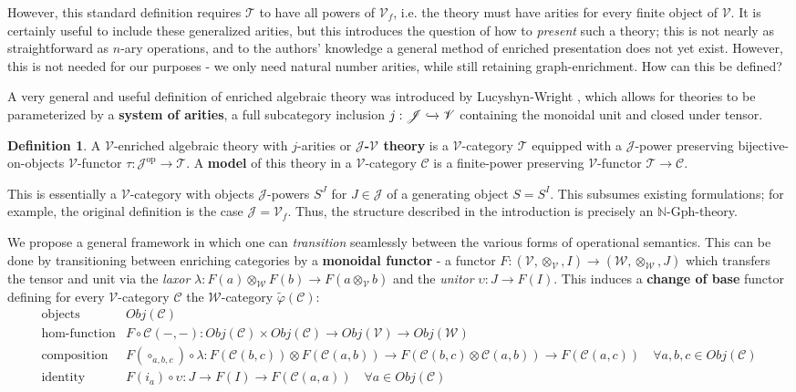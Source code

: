 \documentclass[a4paper,UKenglish]{article}
\theoremstyle{definition}
\newtheorem{definition}{Definition}[section]
\newcommand{\Gph}{\mathrm{Gph}}
\newcommand{\op}{\mathrm{op}}
\newcommand{\NN}{\mathbb{N}}
\newcommand{\V}{\mathscr{V}}
\newcommand{\W}{\mathscr{W}}
\newcommand{\C}{\mathscr{C}}
\newcommand{\T}{\mathscr{T}}
\newcommand{\J}{\mathscr{J}}
\begin{document}
However, this standard definition requires $\T$ to have all powers of $\V_f$, i.e. the theory must have arities for every finite object of $\V$. It is certainly useful to include these generalized arities, but this introduces the question of how to \textit{present} such a theory; this is not nearly as straightforward as $n$-ary operations, and to the authors' knowledge a general method of enriched presentation does not yet exist. However, this is not needed for our purposes - we only need natural number arities, while still retaining graph-enrichment. How can this be defined?

A very general and useful definition of enriched algebraic theory was introduced by Lucyshyn-Wright \cite{rbb}, which allows for theories to be parameterized by a \textbf{system of arities}, a full subcategory inclusion $j: \J \xhookrightarrow{} \V$ containing the monoidal unit and closed under tensor.

\theoremstyle{definition}
\begin{definition} A $\V$-enriched algebraic theory with $j$-arities or \textbf{$\J$-$\V$ theory} is a $\V$-category $\T$ equipped with a $\J$-power preserving bijective-on-objects $\V$-functor $\tau:\J^\op \to \T$. A \textbf{model} of this theory in a $\V$-category $\C$ is a finite-power preserving $\V$-functor $\T \to \C$.
\end{definition}

This is essentially a $\V$-category with objects $\J$-powers $S^J$ for $J \in \J$ of a generating object $S = S^I$. This subsumes existing formulations; for example, the original definition is the case $\J = \V_f$. Thus, the structure described in the introduction is precisely an $\NN$-$\Gph$-theory.



We propose a general framework in which one can \textit{transition} seamlessly between the various forms of operational semantics. This can be done by transitioning between enriching categories by a \textbf{monoidal functor} - a functor $F: (\V,\otimes_\V,I) \to (\W,\otimes_\W,J)$ which transfers the tensor and unit via the \textit{laxor} $\lambda: F(a) \otimes_\W F(b) \to F(a\otimes_\V b)$ and the \textit{unitor} $\upsilon: J \to F(I)$. This induces a \textbf{change of base} functor \cite{borceux} defining for every $\V$-category $\C$ the $\W$-category $\widetilde{\varphi}(\C)$:
\[\begin{array}{rl}
\text{objects} & Obj(\C)\\
\text{hom-function} & F \circ \C(-,-):Obj(\C) \times Obj(\C) \to Obj(\V) \to Obj(\W)\\
\text{composition} & F(\circ_{a,b,c}) \circ \lambda:F(\C(b,c)) \otimes F(\C(a,b)) \to F(\C(b,c) \otimes \C(a,b)) \to F(\C(a,c)) \quad \forall a,b,c \in Obj(\C)\\
\text{identity} & F(i_a) \circ \upsilon: J \to F(I) \to F(\C(a,a)) \quad \forall a \in Obj(\C)\\
\end{array}\]
\end{document}
